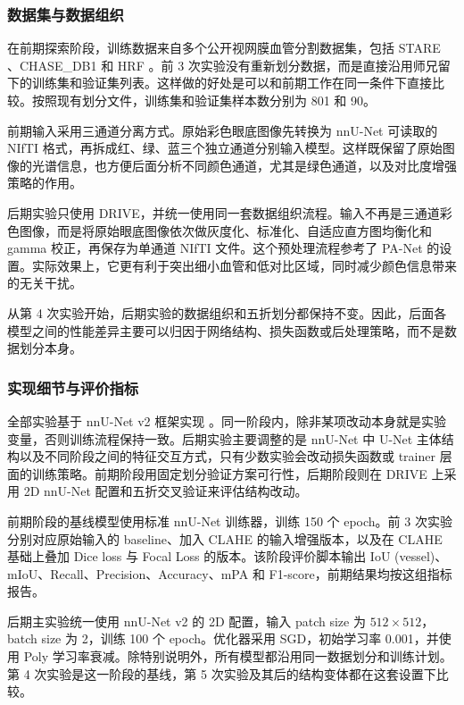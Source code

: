 \documentclass[a4paper,12pt]{article}
\begin{document}
\subsubsection{数据集与数据组织}

在前期探索阶段，训练数据来自多个公开视网膜血管分割数据集，包括 STARE \cite{hoover2000locating}、CHASE\_DB1 \cite{fraz2012ensemble} 和 HRF \cite{budai2013robust}。前 3 次实验没有重新划分数据，而是直接沿用师兄留下的训练集和验证集列表。这样做的好处是可以和前期工作在同一条件下直接比较。按照现有划分文件，训练集和验证集样本数分别为 801 和 90。

前期输入采用三通道分离方式。原始彩色眼底图像先转换为 nnU-Net 可读取的 NIfTI 格式，再拆成红、绿、蓝三个独立通道分别输入模型。这样既保留了原始图像的光谱信息，也方便后面分析不同颜色通道，尤其是绿色通道，以及对比度增强策略的作用。

后期实验只使用 DRIVE，并统一使用同一套数据组织流程。输入不再是三通道彩色图像，而是将原始眼底图像依次做灰度化、标准化、自适应直方图均衡化和 gamma 校正，再保存为单通道 NIfTI 文件。这个预处理流程参考了 PA-Net \cite{luo2025panet} 的设置。实际效果上，它更有利于突出细小血管和低对比区域，同时减少颜色信息带来的无关干扰。

从第 4 次实验开始，后期实验的数据组织和五折划分都保持不变。因此，后面各模型之间的性能差异主要可以归因于网络结构、损失函数或后处理策略，而不是数据划分本身。

\subsubsection{实现细节与评价指标}

全部实验基于 nnU-Net v2 框架实现 \cite{isensee2021nnunet}。同一阶段内，除非某项改动本身就是实验变量，否则训练流程保持一致。后期实验主要调整的是 nnU-Net 中 U-Net 主体结构以及不同阶段之间的特征交互方式，只有少数实验会改动损失函数或 trainer 层面的训练策略。前期阶段用固定划分验证方案可行性，后期阶段则在 DRIVE 上采用 2D nnU-Net 配置和五折交叉验证来评估结构改动。

前期阶段的基线模型使用标准 nnU-Net 训练器，训练 150 个 epoch。前 3 次实验分别对应原始输入的 baseline、加入 CLAHE 的输入增强版本，以及在 CLAHE 基础上叠加 Dice loss 与 Focal Loss 的版本。该阶段评价脚本输出 IoU (vessel)、mIoU、Recall、Precision、Accuracy、mPA 和 F1-score，前期结果均按这组指标报告。

后期主实验统一使用 nnU-Net v2 的 2D 配置，输入 patch size 为 \(512 \times 512\)，batch size 为 2，训练 100 个 epoch。优化器采用 SGD，初始学习率 0.001，并使用 Poly 学习率衰减。除特别说明外，所有模型都沿用同一数据划分和训练计划。第 4 次实验是这一阶段的基线，第 5 次实验及其后的结构变体都在这套设置下比较。
\end{document}
